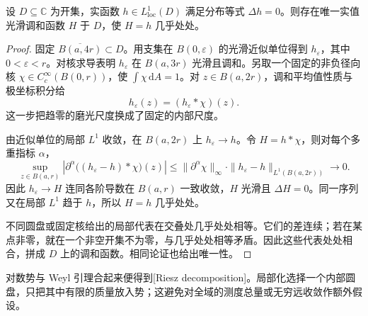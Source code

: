 \begin{lemma}[Weyl]\label{b3:lem:15-weyl}
设 \(D\subseteq\mathbb C\) 为开集，实函数 \(h\in L^1_{\mathrm{loc}}(D)\) 满足分布等式 \(\Delta h=0\)。则存在唯一实值光滑调和函数 \(H\) 于 \(D\)，使 \(H=h\) 几乎处处。
\end{lemma}
\begin{proof}
固定 \(\overline{B(a,4r)}\subset D\)。用支集在 \(B(0,\varepsilon)\) 的光滑近似单位得到 \(h_\varepsilon\)，其中 \(0<\varepsilon<r\)。对核求导表明 \(h_\varepsilon\) 在 \(B(a,3r)\) 光滑且调和。另取一个固定的非负径向核 \(\chi\in C_c^\infty(B(0,r))\)，使 \(\int\chi\,\mathrm{d}A=1\)。对 \(z\in B(a,2r)\)，调和平均值性质与极坐标积分给
\[
 h_\varepsilon(z)=(h_\varepsilon*\chi)(z).
\]
这一步把趋零的磨光尺度换成了固定的内部尺度。

由近似单位的局部 \(L^1\) 收敛，在 \(B(a,2r)\) 上 \(h_\varepsilon\to h\)。令 \(H=h*\chi\)，则对每个多重指标 \(\alpha\)，
\[
 \sup_{z\in B(a,r)}
 \left|\partial^\alpha\bigl((h_\varepsilon-h)*\chi\bigr)(z)\right|
 \le\|\partial^\alpha\chi\|_\infty
 \cdot\|h_\varepsilon-h\|_{L^1(B(a,2r))}\longrightarrow0.
\]
因此 \(h_\varepsilon\to H\) 连同各阶导数在 \(B(a,r)\) 一致收敛，\(H\) 光滑且 \(\Delta H=0\)。同一序列又在局部 \(L^1\) 趋于 \(h\)，所以 \(H=h\) 几乎处处。

不同圆盘或固定核给出的局部代表在交叠处几乎处处相等。它们的差连续；若在某点非零，就在一个非空开集不为零，与几乎处处相等矛盾。因此这些代表处处相合，拼成 \(D\) 上的调和函数。相同论证也给出唯一性。
\end{proof}

对数势与 Weyl 引理合起来便得到[Riesz decomposition]。局部化选择一个内部圆盘，只把其中有限的质量放入势；这避免对全域的测度总量或无穷远收敛作额外假设。

